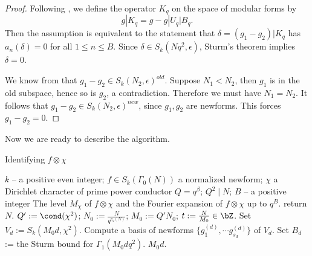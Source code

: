 \documentclass [11pt, proquest] {uwthesis}[2015/03/03]
\begin{document}
\begin{proof}
Following \cite{atkin1978twists}, we define the operator $K_q$ on the space of modular forms by
\[
	g|K_q = g - g|U_q|B_q. 
\]
Then the assumption is equivalent to the statement that $\delta  = (g_1 -g_2) |K_q$ has $a_n(\delta) = 0$ for all $1 \leq n \leq B$. Since $\delta \in S_k(Nq^2, \epsilon)$,  Sturm's theorem implies $\delta = 0$.

We know from \cite[Theorem 5.7.1]{diamond2006first}  that $g_1 - g_2 \in S_k(N_2,\epsilon)^{old}$. Suppose $N_1 < N_2$, then $g_1$ is in the old subspace, hence so is $g_2$, a contradiction. Therefore we must have $N_1 = N_2$. It follows that $g_1 - g_2 \in S_k(N_2, \epsilon)^{new}$, since $g_1, g_2$ are newforms. This forces $g_1 - g_2  = 0$. 
\end{proof}

Now we are ready to describe the algorithm. 

\begin{algorithm}[H]
\caption{Identifying  $f \otimes \chi$}
\label{alg: twist}
\begin{algorithmic}[1]
    \Require $k$ -- a positive even integer; $f \in S_k(\Gamma_0(N))$ a normalized newform; $\chi$ a Dirichlet character of prime power conductor $Q = q^\beta$; $Q^2 \mid N$;  $B$ -- a positive integer
    \Ensure The level $M_\chi$ of $f \otimes \chi$ and the Fourier expansion of $f \otimes \chi$ up to $q^B$.
    \State return $N$.
    \EndIf
    \State $Q' := \cond(\chi^2)$; $N_0 := \frac{N}{q^{v_q(N)}}$; $M_0 := Q'N_0$; $t := \frac{N}{M_0} \in \bZ$. 
    	\State Set $V_d := S_k(M_0d, \chi^2)$. 
	\State Compute a basis of newforms $\{g_1^{(d)}, \cdots g_{s_d}^{(d)}\}$ of $V_d$.
    	\State Set $B_d$ := the Sturm bound for $\Gamma_1(M_0dq^2)$. 
			\State \Return $M_0d$.
		\EndIf
	\EndFor
    \EndFor	
\end{algorithmic}
\end{algorithm}


\end{document}
